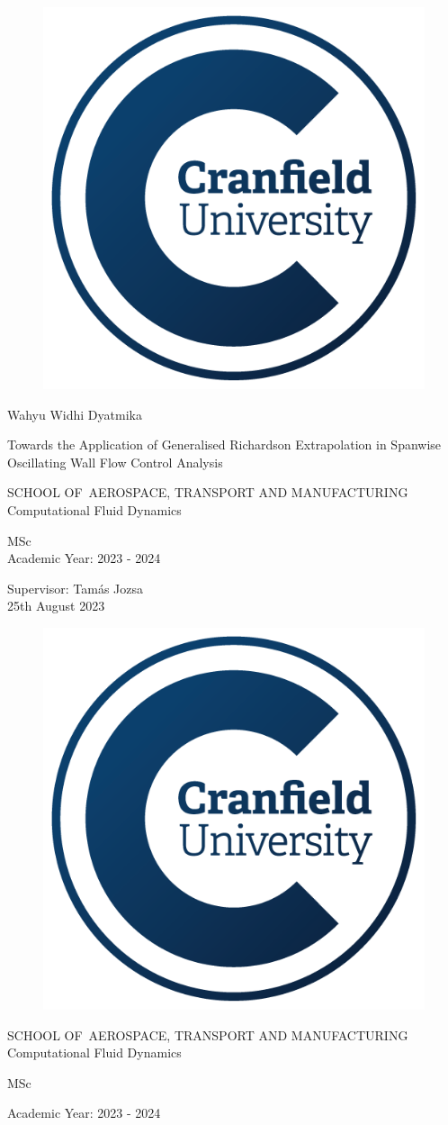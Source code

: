 {  \makeatletter
    \centering\Large\singlespacing%
    \pagestyle{empty}%
    \begin{figure}[H]
    \centering
    \includegraphics[width=0.3\linewidth]{Figures/CULogo.png}
    \label{fig:lOGO}
\end{figure}

    \par
    Wahyu Widhi Dyatmika\par
    \vfill
    Towards the Application of Generalised Richardson Extrapolation in Spanwise Oscillating Wall Flow Control Analysis\par
    \vfill%
    SCHOOL OF~\MakeUppercase{AEROSPACE, TRANSPORT AND
MANUFACTURING}\\%
    Computational Fluid Dynamics\par%
    \vfill
    MSc\\
     Academic Year: 2023 - 2024\par
   \vfill
   Supervisor: Tamás Jozsa\\%
   25th August 2023\par
    \vfill\null\cleardoublepage
    \centering\Large%
    \pagestyle{empty}
    \begin{figure}[H]
    \centering
    \includegraphics[width=0.3\linewidth]{Figures/CULogo.png}
    \label{fig:culogo}
\end{figure}
\par
    \vfill%
    SCHOOL OF~\MakeUppercase{AEROSPACE, TRANSPORT AND
MANUFACTURING}\\%
    Computational Fluid Dynamics\par%
    \vfill
    MSc\par%
    \vfill
    Academic Year: 2023 - 2024\par%
}
